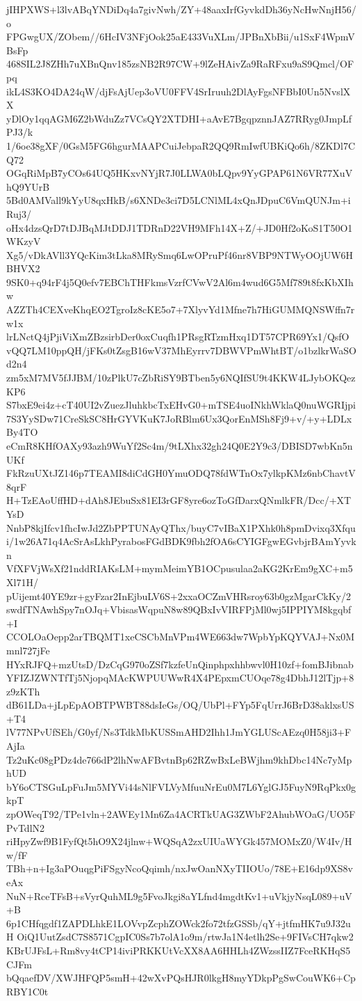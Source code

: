 jIHPXWS+l3lvABqYNDiDq4a7givNwh/ZY+48aaxIrfGyvkdDh36yNcHwNnjH56/o
FPGwgUX/ZObem//6HcIV3NFjOok25aE433VuXLm/JPBnXbBii/u1SxF4WpmVBsFp
468SIL2J8ZHh7uXBnQnv185zsNB2R97CW+9lZeHAivZa9RaRFxu9aS9Qmcl/OFpq
ikL4S3KO4DA24qW/djFsAjUep3oVU0FFV4SrIruuh2DlAyFgsNFBbI0Un5NvslXX
yDlOy1qqAGM6Z2bWduZz7VCsQY2XTDHI+aAvE7BgqpznnJAZ7RRyg0JmpLfPJ3/k
1/6oe38gXF/0GsM5FG6hgurMAAPCuiJebpaR2QQ9RmIwfUBKiQo6h/8ZKDl7CQ72
OGqRiMpB7yCOs64UQ5HKxvNYjR7J0LLWA0bLQpv9YyGPAP61N6VR77XuVhQ9YUrB
5Bd0AMVall9kYyU8qxHkB/s6XNDe3ci7D5LCNlML4xQnJDpuC6VmQUNJm+iRuj3/
oHx4dzsQrD7tDJBqMJtDDJ1TDRnD22VH9MFh14X+Z/+JD0Hf2oKoS1T50O1WKzyV
Xg5/vDkAVll3YQcKim3tLka8MRySmq6LwOPruPf46nr8VBP9NTWyOOjUW6HBHVX2
9SK0+q94rF4j5Q0efv7EBChTHFkmsVzrfCVwV2Al6m4wud6G5Mf789t8fxKbXIhw
AZZTh4CEXveKhqEO2TgroIz8cKE5o7+7XlyvYd1Mfne7h7HiGUMMQNSWffn7rw1x
lrLNctQ4jPjiViXmZBzsirbDer0oxCuqfh1PRsgRTzmHxq1DT57CPR69Yx1/QsfO
vQQ7LM10ppQH/jFKs0tZsgB16wV37MhEyrrv7DBWVPmWhtBT/o1bzlkrWaSOd2n4
zm5xM7MV5fJJBM/10zPlkU7cZbRiSY9BTben5y6NQIfSU9t4KKW4LJybOKQezKP6
S7bxE9ei4z+cT40UI2vZuezJluhkbcTxEHvG0+mTSE4uoINkhWklaQ0nuWGRIjpi
7S3YySDw71CreSkSC8HrGYVKuK7JoRBlm6Ux3QorEnMSh8Fj9+v/+y+LDLxBy4TO
eCmR8KHfOAXy93azh9WuYf2Sc4m/9tLXhx32gh24Q0E2Y9c3/DBISD7wbKn5nUKf
FkRzuUXtJZ146p7TEAMI8diCdGH0YmuODQ78fdWTnOx7ylkpKMz6nbChavtV8qrF
H+TzEAoUffHD+dAh8JEbuSx81EI3rGF8yre6ozToGfDarxQNmlkFR/Dcc/+XTYsD
NnbP8kjIfcv1fhcIwJd2ZbPPTUNAyQThx/buyC7vIBaX1PXhk0h8pmDvixq3Xfqu
i/1w26A71q4AcSrAsLkhPyrabosFGdBDK9fbh2fOA6sCYIGFgwEGvbjrBAmYyvkn
VfXFVjWsXf21nddRIAKsLM+mymMeimYB1OCpusulaa2aKG2KrEm9gXC+m5Xl71H/
pUijemt40YE9zr+gyFzar2InEjbuLV6S+2xxaOCZmVHRsroy63b0gzMgarCkKy/2
swdfTNAwhSpy7nOJq+VbisasWqpuN8w89QBxIvVIRFPjMl0wj5IPPIYM8kgqbf+I
CCOLOaOepp2arTBQMT1xeCSCbMnVPm4WE663dw7WpbYpKQYVAJ+Nx0Mmnl727jFe
HYxRJFQ+mzUtsD/DzCqG970oZSf7kzfeUnQinphpxhhbwvl0H10zf+fomBJibnab
YFIZJZWNTfTj5NjopqMAcKWPUUWwR4X4PEpxmCUOqe78g4DbhJ12lTjp+8z9zKTh
dB61LDa+jLpEpAOBTPWBT88dsIeGs/OQ/UbPl+FYp5FqUrrJ6BrD38aklxsUS+T4
lV77NPvUfSEh/G0yf/Ns3TdkMbKUSSmAHD2Ihh1JmYGLUScAEzq0H58ji3+FAjIa
Tz2uKc08gPDz4de766dP2lhNwAFBvtnBp62RZwBxLeBWjhm9khDbc14Nc7yMphUD
bY6oCTSGuLpFuJm5MYVi44sNlFVLVyMfuuNrEu0M7L6YglGJ5FuyN9RqPkx0gkpT
zpOWeqT92/TPe1vln+2AWEy1Mn6Za4ACRTkUAG3ZWbF2AhubWOaG/UO5FPvTdlN2
riHpyZwf9B1FyfQt5hO9X24jlnw+WQSqA2zxUIUaWYGk457MOMxZ0/W4Iv/Hw/fF
TBh+n+Ig3aPOuqgPiFSgyNcoQqimh/nxJwOanNXyTIIOUo/78E+E16dp9XS8veAx
NuN+RceTFsB+sVyrQuhML9g5FvoJkgi8aYLfnd4mgdtKv1+uVkjyNsqL089+uV+B
6p1CHfqgdf1ZAPDLhkE1LOVvpZcphZOWck2fo72tfzGSSb/qY+jtfmHK7u9J32uH
OiQ1UutZsdC7S8571CgpIC0Ss7b7olA1o9m/rtwJa1N4etlh2Se+9FIVsCH7qkw2
KBrUJFsL+Rm8vy4tCP14iviPRKKUtVcXX8AA6HHLh4ZWzssIIZ7FceRKHqS5CJFm
bQqaefDV/XWJHFQP5smH+42wXvPQsHJR0lkgH8myYDkpPgSwCouWK6+CpRBY1C0t
